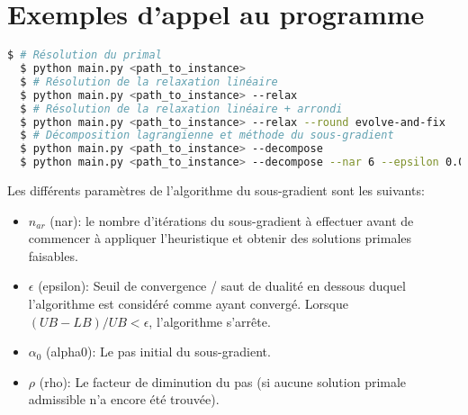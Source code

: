 \chapter{Exemples d'appel au programme}
\vspace*{1.2cm}

\begin{lstlisting}[language=bash]
  $ # Résolution du primal
  $ python main.py <path_to_instance>
  $ # Résolution de la relaxation linéaire
  $ python main.py <path_to_instance> --relax
  $ # Résolution de la relaxation linéaire + arrondi
  $ python main.py <path_to_instance> --relax --round evolve-and-fix
  $ # Décomposition lagrangienne et méthode du sous-gradient
  $ python main.py <path_to_instance> --decompose
  $ python main.py <path_to_instance> --decompose --nar 6 --epsilon 0.01 --alpha0 2000 --rho 0.96
\end{lstlisting}

Les différents paramètres de l'algorithme du sous-gradient sont les suivants:
\begin{itemize}
    \item $n_{ar}$ (nar): le nombre d'itérations du sous-gradient à effectuer avant de commencer à appliquer
    l'heuristique et obtenir des solutions primales faisables.
    \item $\epsilon$ (epsilon): Seuil de convergence / saut de dualité en dessous duquel l'algorithme est considéré comme
    ayant convergé. Lorsque $(UB - LB) / UB  < \epsilon$, l'algorithme s'arrête.
    \item $\alpha_0$ (alpha0): Le pas initial du sous-gradient.
    \item $\rho$ (rho): Le facteur de diminution du pas (si aucune solution primale admissible n'a encore été trouvée).
\end{itemize}